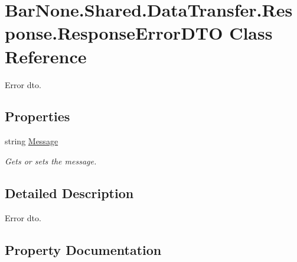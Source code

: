 \hypertarget{class_bar_none_1_1_shared_1_1_data_transfer_1_1_response_1_1_response_error_d_t_o}{}\section{Bar\+None.\+Shared.\+Data\+Transfer.\+Response.\+Response\+Error\+D\+TO Class Reference}
\label{class_bar_none_1_1_shared_1_1_data_transfer_1_1_response_1_1_response_error_d_t_o}


Error dto.  


\subsection*{Properties}
\begin{DoxyCompactItemize}
\item 
string \mbox{\hyperlink{class_bar_none_1_1_shared_1_1_data_transfer_1_1_response_1_1_response_error_d_t_o_af0ef43d1e811f32be71cee899bfca20c}{Message}}
\begin{DoxyCompactList}\small\item\em Gets or sets the message. \end{DoxyCompactList}\end{DoxyCompactItemize}


\subsection{Detailed Description}
Error dto. 



\subsection{Property Documentation}
\mbox{\label{class_bar_none_1_1_shared_1_1_data_transfer_1_1_response_1_1_response_error_d_t_o_af0ef43d1e811f32be71cee899bfca20c}} 
